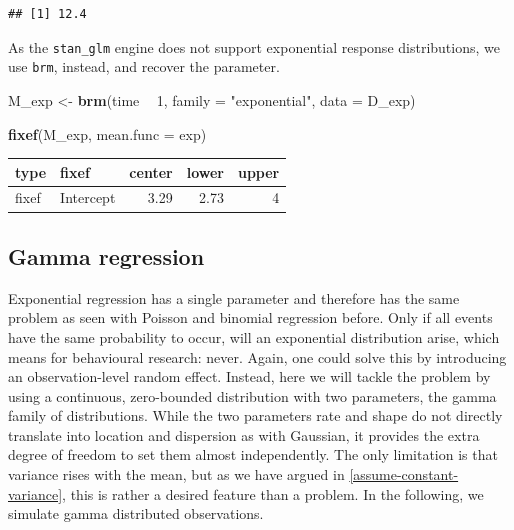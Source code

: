 \documentclass[]{svmono}
\newenvironment{Shaded}{\begin{snugshade}}{\end{snugshade}}
\newcommand{\KeywordTok}[1]{\textcolor[rgb]{0.13,0.29,0.53}{\textbf{#1}}}
\newcommand{\DataTypeTok}[1]{\textcolor[rgb]{0.13,0.29,0.53}{#1}}
\newcommand{\DecValTok}[1]{\textcolor[rgb]{0.00,0.00,0.81}{#1}}
\newcommand{\StringTok}[1]{\textcolor[rgb]{0.31,0.60,0.02}{#1}}
\newcommand{\OperatorTok}[1]{\textcolor[rgb]{0.81,0.36,0.00}{\textbf{#1}}}
\newcommand{\NormalTok}[1]{#1}
\begin{document}
\begin{Shaded}
\end{Shaded}

\begin{verbatim}
## [1] 12.4
\end{verbatim}

As the \texttt{stan\_glm} engine does not support exponential response
distributions, we use \texttt{brm}, instead, and recover the parameter.

\begin{Shaded}
\begin{Highlighting}[]
\NormalTok{M_exp <-}\StringTok{ }\KeywordTok{brm}\NormalTok{(time }\OperatorTok{~}\StringTok{ }\DecValTok{1}\NormalTok{, }
             \DataTypeTok{family =} \StringTok{"exponential"}\NormalTok{, }
             \DataTypeTok{data =}\NormalTok{ D_exp)}
\end{Highlighting}
\end{Shaded}

\begin{Shaded}
\begin{Highlighting}[]
\KeywordTok{fixef}\NormalTok{(M_exp, }\DataTypeTok{mean.func =}\NormalTok{ exp)}
\end{Highlighting}
\end{Shaded}

\begin{longtable}[]{@{}llrrr@{}}
\toprule
type & fixef & center & lower & upper\tabularnewline
\midrule
\endhead
fixef & Intercept & 3.29 & 2.73 & 4\tabularnewline
\bottomrule
\end{longtable}

\subsection{Gamma regression}\label{gamma-regression}

Exponential regression has a single parameter and therefore has the same
problem as seen with Poisson and binomial regression before. Only if all
events have the same probability to occur, will an exponential
distribution arise, which means for behavioural research: never. Again,
one could solve this by introducing an observation-level random effect.
Instead, here we will tackle the problem by using a continuous,
zero-bounded distribution with two parameters, the gamma family of
distributions. While the two parameters rate and shape do not directly
translate into location and dispersion as with Gaussian, it provides the
extra degree of freedom to set them almost independently. The only
limitation is that variance rises with the mean, but as we have argued
in \ref{assume-constant-variance}, this is rather a desired feature than
a problem. In the following, we simulate gamma distributed observations.
\end{document}
